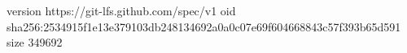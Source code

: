 version https://git-lfs.github.com/spec/v1
oid sha256:2534915f1e13e379103db248134692a0a0c07e69f604668843c57f393b65d591
size 349692
